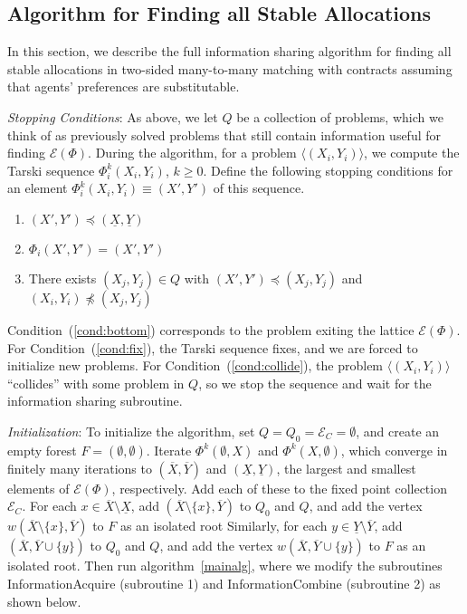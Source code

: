 \documentclass[11pt,reqno]{amsart}
\theoremstyle{definition}
\numberwithin{equation}{section}
\newcommand{\ol}{\overline}
\newcommand{\ul}{\underline}
\newcommand{\lag}{\langle}
\newcommand{\rag}{\rangle}
\newcommand{\fix}{\mathcal{E}}
\newcommand{\peq}{\preceq}
\newcommand{\acto}{Q_0}
\newcommand{\act}{Q}
\newcommand{\forest}{F}
\newcommand{\fixfind}{\mathcal{E}_C}
\newcommand{\topx}{\ol{X}}
\newcommand{\topy}{\ol{Y}}
\newcommand{\botx}{\ul{X}}
\newcommand{\boty}{\ul{Y}}
\begin{document}
\subsection{Algorithm for Finding all Stable Allocations} \label{section:algostable}

In this section, we describe the full information sharing algorithm for finding all stable allocations in two-sided many-to-many matching with contracts assuming that agents' preferences are substitutable.

\emph{Stopping Conditions}:
As above, we let $\act$ be a collection of problems, which we think of as previously solved problems that still contain information useful for finding $\fix(\Phi)$. 
During the algorithm, for a problem $\lag (X_i, Y_i) \rag $, we compute the Tarski sequence $\Phi_i^k(X_i,Y_i)$, $k \geq 0$. 
Define the following stopping conditions for an element $ \Phi_i^k(X_i,Y_i) \equiv (X', Y')$ of this sequence.
\begin{enumerate}
\item $(X',Y') \peq (\botx, \boty)$ \label{cond:bottom}
\item $\Phi_i(X',Y') = (X',Y')$ \label{cond:fix}
\item There exists $(X_j,Y_j) \in \act$ with $(X',Y') \peq (X_j,Y_j)$ and $(X_i,Y_i) \not \peq (X_j,Y_j)$ \label{cond:collide}
\end{enumerate}

Condition~(\ref{cond:bottom}) corresponds to the problem exiting the lattice $\fix(\Phi)$. 
For Condition~(\ref{cond:fix}), the Tarski sequence fixes, and we are forced to initialize new problems.
For Condition~(\ref{cond:collide}), the problem $\lag (X_i, Y_i) \rag$ ``collides'' with some problem in $\act$, so we stop the sequence and wait for the information sharing subroutine.

\emph{Initialization}: To initialize the algorithm, set $\act = \acto = \fixfind = \emptyset$, and create an empty forest $\forest = (\emptyset,\emptyset)$.
Iterate $\Phi^k(\emptyset,X)$ and $\Phi^k(X, \emptyset)$, which converge in finitely many iterations to $(\topx, \topy)$ and $(\botx,\boty)$, the largest and smallest elements of $\fix(\Phi)$, respectively.
Add each of these to the fixed point collection $\fixfind$.
For each $x \in \topx \setminus \botx$, add $(\topx \setminus \{x\}, \topy)$ to $\acto$ and $\act$, and add the vertex $w(\topx \setminus \{x\}, \topy)$ to $\forest$ as an isolated root
Similarly, for each $y \in \boty \setminus \topy$, add $(\topx, \topy \cup \{y\})$ to $\acto$ and $\act$, and add the vertex $w(\topx, \topy \cup \{y\})$ to $\forest$ as an isolated root.
Then run algorithm~\ref{mainalg}, where we modify the subroutines InformationAcquire (subroutine 1) and InformationCombine (subroutine 2) as shown below.
\end{document}
